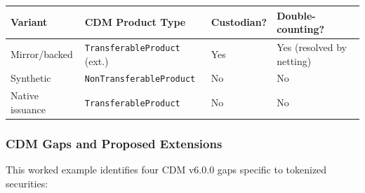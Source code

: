 \documentclass[11pt,a4paper]{article}
\begin{document}
\begin{center}
\small
\begin{tabular}{l l l l}
\toprule
\textbf{Variant} & \textbf{CDM Product Type} & \textbf{Custodian?} & \textbf{Double-counting?} \\
\midrule
Mirror/backed & \texttt{TransferableProduct} (ext.) & Yes & Yes (resolved by netting) \\
Synthetic & \texttt{NonTransferableProduct} & No & No \\
Native issuance & \texttt{TransferableProduct} & No & No \\
\bottomrule
\end{tabular}
\end{center}

\subsubsection{CDM Gaps and Proposed Extensions}
\label{sec:cdm-tokenized-gaps}

This worked example identifies four CDM v6.0.0 gaps specific to tokenized securities:
\end{document}
